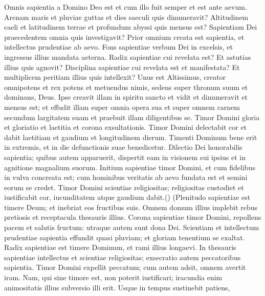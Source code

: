 \begin{biblechapter}
 \verse Omnis sapientia a Domino Deo est
 et cum illo fuit semper et est ante aevum.
 \verse Arenam maris et pluviae guttas
 et dies saeculi quis dinumeravit?
 Altitudinem caeli et latitudinem terrae
 et profundum abyssi quis mensus est?
 \verse Sapientiam Dei praecedentem omnia quis investigavit?
 \verse Prior omnium creata est sapientia,
 et intellectus prudentiae ab aevo.
 \verse Fons sapientiae verbum Dei in excelsis,
 et ingressus illius mandata aeterna.
 \verse Radix sapientiae cui revelata est?
 Et astutias illius quis agnovit?
 \verse Disciplina sapientiae cui revelata est et manifestata?
 Et multiplicem peritiam illius quis intellexit?
 \verse Unus est Altissimus, creator omnipotens
 et rex potens et metuendus nimis,
 sedens super thronum suum et dominans, Deus.
 \verse Ipse creavit illam in spiritu sancto
 et vidit et dinumeravit et mensus est;
 \verse et effudit illam super omnia opera sua
 et super omnem carnem secundum largitatem suam
 et praebuit illam diligentibus se.
 \verse Timor Domini gloria et gloriatio
 et laetitia et corona exsultationis.
 \verse Timor Domini delectabit cor
 et dabit laetitiam et gaudium et longitudinem dierum.
 \verse Timenti Dominum bene erit in extremis,
 et in die defunctionis suae benedicetur.
 \verse Dilectio Dei honorabilis sapientia;
 \verse quibus autem apparuerit, dispertit eam in visionem sui ipsius
 et in agnitione magnalium suorum.
 \verse Initium sapientiae timor Domini,
 et cum fidelibus in vulva concreata est;
 cum hominibus veritatis ab aevo fundata est
 et semini eorum se credet.
 \verse Timor Domini scientiae religiositas;
 \verse religiositas custodiet et iustificabit cor,
 iucunditatem atque gaudium dabit.(\verse)
 (\verse Plenitudo sapientiae est timere Deum;
 et inebriat eos fructibus suis.
 \verse Omnem domum illius implebit rebus pretiosis
 et receptacula thesauris illius.
 \verse Corona sapientiae timor Domini,
 repollens pacem et salutis fructum:
 \verse utraque autem sunt dona Dei.
 \verse Scientiam et intellectum prudentiae sapientia effundit quasi pluviam;
 et gloriam tenentium se exaltat.
 \verse Radix sapientiae est timere Dominum,
 et rami illius longaevi.
 \verse In thesauris sapientiae intellectus et scientiae religiositas;
 exsecratio autem peccatoribus sapientia.
 \verse Timor Domini expellit peccatum;
 cum autem adsit, omnem avertit iram.
 \verse Nam, qui sine timore est, non poterit iustificari;
 iracundia enim animositatis illius subversio illi erit.
 \verse Usque in tempus sustinebit patiens,

\end{biblechapter}
